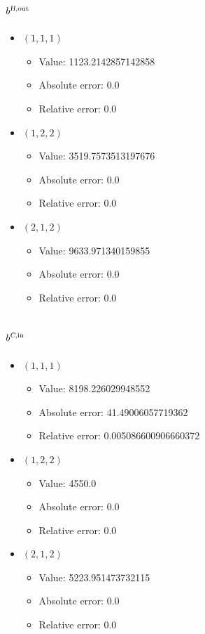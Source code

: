 \documentclass{article}%
\begin{document}
\subsection{$b^{\textsl{H},\text{out}}$}%
\begin{itemize}%
	\item $(1, 1, 1)$%
	\begin{itemize}%
		\item Value: 1123.2142857142858%
		\item Absolute error: 0.0%
		\item Relative error: 0.0%
	\end{itemize}%
	\item $(1, 2, 2)$%
	\begin{itemize}%
		\item Value: 3519.7573513197676%
		\item Absolute error: 0.0%
		\item Relative error: 0.0%
	\end{itemize}%
	\item $(2, 1, 2)$%
	\begin{itemize}%
		\item Value: 9633.971340159855%
		\item Absolute error: 0.0%
		\item Relative error: 0.0%
	\end{itemize}%
\end{itemize}%
\subsection{$b^{\textsl{C},\text{in}}$}%
\begin{itemize}%
	\item $(1, 1, 1)$%
	\begin{itemize}%
		\item Value: 8198.226029948552%
		\item Absolute error: 41.49006057719362%
		\item Relative error: 0.005086600906660372%
	\end{itemize}%
	\item $(1, 2, 2)$%
	\begin{itemize}%
		\item Value: 4550.0%
		\item Absolute error: 0.0%
		\item Relative error: 0.0%
	\end{itemize}%
	\item $(2, 1, 2)$%
	\begin{itemize}%
		\item Value: 5223.951473732115%
		\item Absolute error: 0.0%
		\item Relative error: 0.0%
	\end{itemize}%
\end{itemize}%
\end{document}
